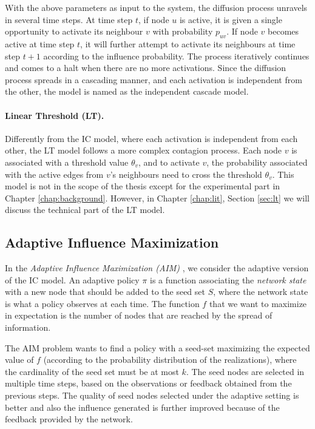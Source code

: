 With the above parameters as input to the system, the diffusion process unravels in several time steps. At time step $t$, if node $u$ is active, it is given a single opportunity to activate its neighbour $v$ with probability $p_{uv}$. If node $v$ becomes active at time step $t$, it will further attempt to activate its neighbours at time step $t+1$ according to the influence probability. The process iteratively continues and comes to a halt when there are no more activations. Since the diffusion process spreads in a cascading manner, and each activation is independent from the other, the model is named as the independent cascade model.


\paragraph*{Linear Threshold (LT).} Differently from the IC model, where each activation is independent from each other, the LT model follows a more complex contagion process. Each node $v$ is  associated with a threshold value $\theta_v$, and to activate $v$, the probability associated with the  active edges from $v$'s neighbours need to cross the threshold $\theta_v$. This model is not in the scope of the thesis except for the experimental part in Chapter \ref{chap:background}. However, in Chapter \ref{chap:lit}, Section \ref{sec:lt} we will discuss the technical part of the LT model. 

\subsection*{Adaptive Influence Maximization}

In the \emph{Adaptive Influence Maximization (AIM)} \cite{Golovin2011}, we consider the adaptive version of the IC model. An adaptive policy $\pi$ is a function associating the {\em network state} with a new node that should be added to the seed set $S$, where the network state is what a policy observes at each time. The function $f$ that we want to maximize in expectation is the number of nodes that are reached by the spread of information.

The AIM problem wants to find a policy with a seed-set maximizing the expected value of $f$ (according to the probability distribution of the realizations), where the cardinality of the seed set must be at most $k$. The seed nodes are selected in multiple time steps, based on the observations or feedback obtained from the previous steps. The quality of seed nodes selected under the adaptive setting is better and also the influence generated is further improved because of the feedback provided by the network.




